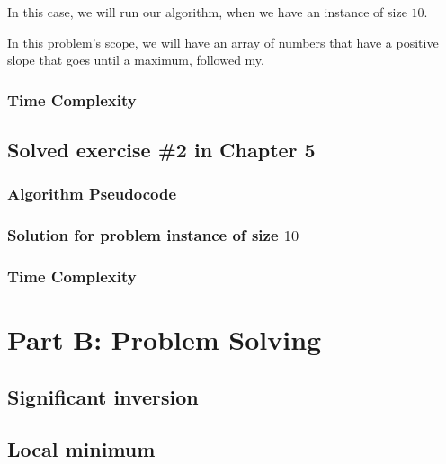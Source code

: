 \documentclass{article}
\begin{document}
In this case, we will run our algorithm, when we have an instance of size $10$.

In this problem's scope, we will have an array of numbers that have a positive slope that goes until a maximum, followed my.

\subsubsection*{Time Complexity}

\subsection*{Solved exercise \#2 in Chapter 5}

\subsubsection*{Algorithm Pseudocode}

\subsubsection*{Solution for problem instance of size $10$}

\subsubsection*{Time Complexity}
 
\section*{Part B: Problem Solving}

\subsection*{Significant inversion}

\subsection*{Local minimum}
\end{document}
